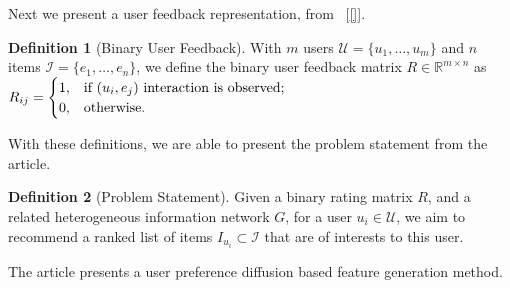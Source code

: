 \documentclass{article}
\theoremstyle{plain}
\theoremstyle{definition}
\newtheorem{defn}{Definition}[section]
\theoremstyle{remark}
\begin{document}
Next we present a user feedback representation, from ~[\ref{}].

\begin{defn}[Binary User Feedback]
With $m$ users $\mathcal{U} = \{ u_1, \dots,u_m\}$ and $n$ items $\mathcal{I} = \{e_1, \dots,e_n\}$, we define the binary user feedback matrix $R \in \mathbb{R}^{m\times n}$ as
$
\begin{displaystyle}
  R_{ij} = 
  \begin{cases}
    1,  & \text{if } (u_i, e_j) \text{ interaction is observed;}\\
    0,  & \text{otherwise.}\\
  \end{cases}
\end{displaystyle}$
\end{defn}


With these definitions, we are able to present the problem statement from the article.

\begin{defn}[Problem Statement]
Given a binary rating matrix $R$, and a related heterogeneous information network $G$, for a user $u_i \in \mathcal{U}$, we aim to recommend a ranked list of items $I_{u_i} \subset \mathcal{I}$ that are of interests to this user. 
\end{defn}

The article presents a user preference diffusion based feature generation method.

 


\nocite{}



\end{document}
